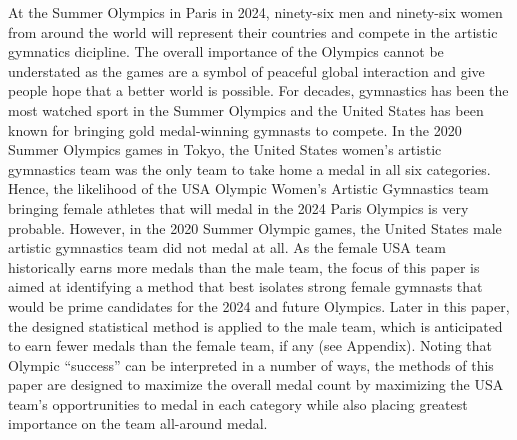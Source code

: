 \documentclass[12pt]{article}
\begin{document}
At the Summer Olympics in Paris in 2024, ninety-six men and ninety-six women from around the world will 
represent their countries and compete in the artistic gymnatics dicipline. The overall importance of the Olympics 
cannot be understated as the games are a symbol of peaceful global interaction and give people hope that a better 
world is possible. For decades, gymnastics has been the most watched sport in the Summer Olympics and the United 
States has been known for bringing gold medal-winning gymnasts to compete. In the 2020 
Summer Olympics games in Tokyo, the United States women's artistic gymnastics team was the only team to take 
home a medal in all six categories. Hence, the likelihood of the USA Olympic Women’s Artistic Gymnastics 
team bringing female athletes that will medal in the 2024 Paris Olympics is very probable. 
However, in the 2020 Summer Olympic games, the United States 
male artistic gymnastics team did not medal at all. As the female USA team historically earns more medals than 
the male team, the focus of this paper is aimed at identifying a method that best isolates strong female gymnasts 
that would be prime candidates for the 2024 and future Olympics. Later in this paper, the designed statistical 
method is applied to the male team, which is anticipated to earn fewer medals than the female team, if any 
(see Appendix). Noting that Olympic ``success'' can be interpreted in a number of ways, the methods of this 
paper are designed to maximize the overall medal count by maximizing the USA team's opportrunities to medal in each 
category while also placing greatest importance on the team all-around medal. 

\\
\end{document}
